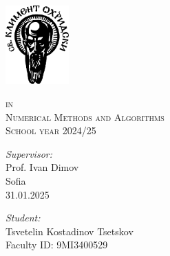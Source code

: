 \begin{titlepage}
    \begin{center}
        \vspace*{-2.3cm}
        \includegraphics[height=3cm]{resources/su_logo.png}

        \vspace*{.06\textheight}
        {\scshape\large \univname\par}\vspace{2.5cm}

        {\huge \bfseries{\thetitle}\par}\vspace{0.7cm}
        \textsc{\small in }\\[0.6cm]
        \textsc{\Large Numerical Methods and Algorithms}\\[0.5cm]\vspace{0.5cm}
        \textsc{\normalsize School year 2024/25}\\[0.6cm]\vspace{2.2cm}


        \begin{minipage}[t]{0.4\textwidth}
            \begin{flushleft} \large
                \emph{Supervisor:}\\[0.7cm]
                Prof. Ivan Dimov\\[0.7cm]
                Sofia\\[0.5cm]
                {\large 31.01.2025}
            \end{flushleft}
        \end{minipage}
        \begin{minipage}[t]{0.4\textwidth}
            \begin{flushright} \large
                \emph{Student:}\\[0.7cm]
                Tsvetelin Kostadinov Tsetskov\\[0.5cm]
                Faculty ID: 9MI3400529\\[0.5cm]
            \end{flushright}
        \end{minipage}

    \end{center}
\end{titlepage}